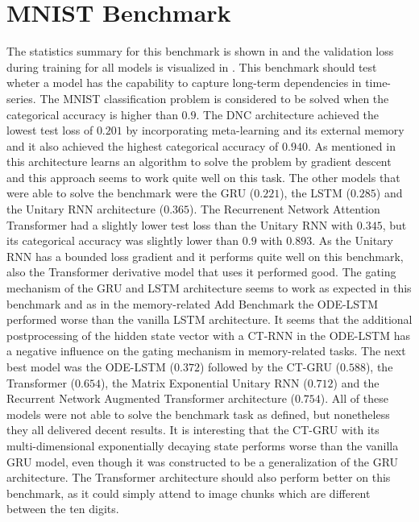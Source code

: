 \documentclass[draft,final]{vutinfth} %
\begin{document}
    \section{MNIST Benchmark} \label{mnist_results}
    The statistics summary for this benchmark is shown in  and the validation loss during training for all models is visualized in .
    This benchmark should test wheter a model has the capability to capture long-term dependencies in time-series.
    The MNIST classification problem is considered to be solved when the categorical accuracy is higher than $0.9$.
    The DNC architecture achieved the lowest test loss of $0.201$ by incorporating meta-learning and its external memory and it also achieved the highest categorical accuracy of $0.940$.
    As mentioned in  this architecture learns an algorithm to solve the problem by gradient descent and this approach seems to work quite well on this task.
    The other models that were able to solve the benchmark were the GRU ($0.221$), the LSTM ($0.285$) and the Unitary RNN architecture ($0.365$). 
    The Recurrenent Network Attention Transformer had a slightly lower test loss than the Unitary RNN with $0.345$, but its categorical accuracy was slightly lower than $0.9$ with $0.893$.
    As the Unitary RNN has a bounded loss gradient and it performs quite well on this benchmark, also the Transformer derivative model that uses it performed good.
    The gating mechanism of the GRU and LSTM architecture seems to work as expected in this benchmark and as in the memory-related Add Benchmark the ODE-LSTM performed worse than the vanilla LSTM architecture.
    It seems that the additional postprocessing of the hidden state vector with a CT-RNN in the ODE-LSTM has a negative influence on the gating mechanism in memory-related tasks.
    The next best model was the ODE-LSTM ($0.372$) followed by the CT-GRU ($0.588$), the Transformer ($0.654$), the Matrix Exponential Unitary RNN ($0.712$) and the Recurrent Network Augmented Transformer architecture ($0.754$).
    All of these models were not able to solve the benchmark task as defined, but nonetheless they all delivered decent results.
    It is interesting that the CT-GRU with its multi-dimensional exponentially decaying state performs worse than the vanilla GRU model, even though it was constructed to be a generalization of the GRU architecture.
    The Transformer architecture should also perform better on this benchmark, as it could simply attend to image chunks which are different between the ten digits.
\end{document}
